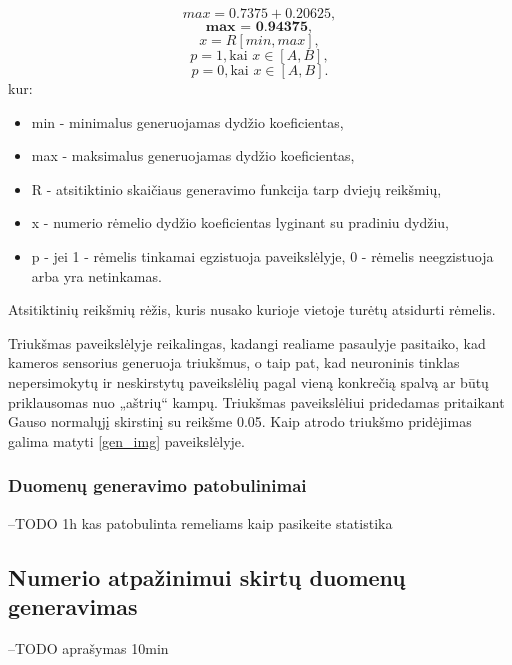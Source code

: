 \documentclass{VUMIFInfBakalaurinis}
\begin{document}
\begin{equation*}
  max = 0.7375 + 0.20625,
\end{equation*}
\begin{equation*}
  \textbf{max = 0.94375},
\end{equation*}
\begin{equation*}
  x = R[min, max],
\end{equation*}
\begin{equation*}
  p = 1, \text{kai } x \in [A, B],
\end{equation*}
\begin{equation*}
  p = 0, \text{kai } x \in [A, B].
\end{equation*}
kur:
\begin{itemize}[itemsep=0.5pt]
  \item min - minimalus generuojamas dydžio koeficientas,
  \item max - maksimalus generuojamas dydžio koeficientas,
  \item R - atsitiktinio skaičiaus generavimo funkcija tarp dviejų reikšmių,
  \item x - numerio rėmelio dydžio koeficientas lyginant su pradiniu dydžiu,
  \item p - jei 1 - rėmelis tinkamai egzistuoja paveikslėlyje, 0 - rėmelis neegzistuoja arba yra netinkamas.
\end{itemize}

Atsitiktinių reikšmių rėžis, kuris nusako kurioje vietoje turėtų atsidurti rėmelis.

Triukšmas paveikslėlyje reikalingas, kadangi realiame pasaulyje pasitaiko, kad kameros sensorius generuoja triukšmus, o taip pat,
kad neuroninis tinklas nepersimokytų ir neskirstytų paveikslėlių pagal vieną konkrečią spalvą ar būtų priklausomas nuo „aštrių“ kampų.
Triukšmas paveikslėliui pridedamas pritaikant Gauso normalųjį skirstinį su reikšme 0.05.
Kaip atrodo triukšmo pridėjimas galima matyti \ref{gen_img} paveikslėlyje.

\subsubsection{Duomenų generavimo patobulinimai}
--TODO
1h
kas patobulinta remeliams
kaip pasikeite statistika


\subsection{Numerio atpažinimui skirtų duomenų generavimas}
--TODO
aprašymas 10min
\end{document}

